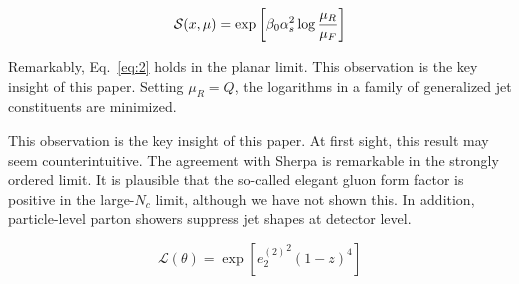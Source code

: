 \begin{equation}
  \mathcal{S}(x, \mu) = \exp\left[\beta_0 \alpha_s^2 \log\frac{\mu_R}{\mu_F}\right]
  \label{eq:8}
\end{equation}

Remarkably, Eq.~\eqref{eq:2} holds in the planar limit. This observation
is the key insight of this paper. Setting $\mu_R = Q$, the logarithms in
a family of generalized jet constituents are minimized.

This observation is the key insight of this paper. At first sight, this
result may seem counterintuitive. The agreement with Sherpa is
remarkable in the strongly ordered limit. It is plausible that the
so-called elegant gluon form factor is positive in the large-$N_c$
limit, although we have not shown this. In addition, particle-level
parton showers suppress jet shapes at detector level.

\begin{equation}
  \mathcal{L}(\theta) = \exp\left[{e_2^{(2)}}^{2} (1 - z)^{4}\right]
  \label{eq:10}
\end{equation}

